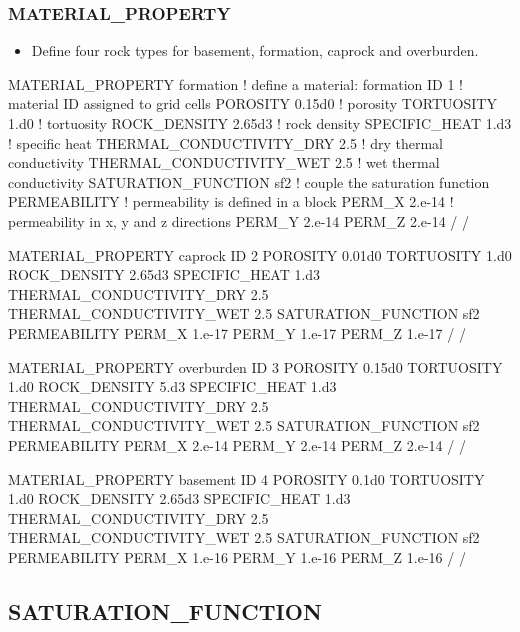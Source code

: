 \documentclass{beamer}
\newcommand\bluecomment[1]{{{\color{blue} #1}}}
\newcommand\greencomment[1]{{{\color{green} #1}}}
\begin{document}
\begin{frame}\frametitle{MATERIAL\_PROPERTY}

\begin{itemize}
  \item Define four rock types for basement, formation, caprock and overburden.
\end{itemize}

\begin{semiverbatim}
MATERIAL_PROPERTY formation \bluecomment{! define a material:} \greencomment{formation}
  ID 1  \bluecomment{! material ID assigned to grid cells}
  POROSITY 0.15d0 \bluecomment{! porosity}
  TORTUOSITY 1.d0 \bluecomment{! tortuosity}
  ROCK_DENSITY 2.65d3 \bluecomment{! rock density}
  SPECIFIC_HEAT 1.d3 \bluecomment{! specific heat}
  THERMAL_CONDUCTIVITY_DRY 2.5 \bluecomment{! dry thermal conductivity}
  THERMAL_CONDUCTIVITY_WET 2.5 \bluecomment{! wet thermal conductivity} 
  SATURATION_FUNCTION sf2 \bluecomment{! couple the saturation function}
  PERMEABILITY \bluecomment{! permeability is defined in a block}
    PERM_X 2.e-14 \bluecomment{! permeability in x, y and z directions}
    PERM_Y 2.e-14
    PERM_Z 2.e-14
  /
/

MATERIAL_PROPERTY caprock
  ID 2
  POROSITY 0.01d0
  TORTUOSITY 1.d0
  ROCK_DENSITY 2.65d3
  SPECIFIC_HEAT 1.d3
  THERMAL_CONDUCTIVITY_DRY 2.5
  THERMAL_CONDUCTIVITY_WET 2.5 
  SATURATION_FUNCTION sf2
  PERMEABILITY
    PERM_X 1.e-17
    PERM_Y 1.e-17
    PERM_Z 1.e-17
  /
/

MATERIAL_PROPERTY overburden
  ID 3
  POROSITY 0.15d0
  TORTUOSITY 1.d0
  ROCK_DENSITY 5.d3
  SPECIFIC_HEAT 1.d3
  THERMAL_CONDUCTIVITY_DRY 2.5
  THERMAL_CONDUCTIVITY_WET 2.5 
  SATURATION_FUNCTION sf2
  PERMEABILITY
    PERM_X 2.e-14
    PERM_Y 2.e-14
    PERM_Z 2.e-14
  /
/

MATERIAL_PROPERTY basement
  ID 4
  POROSITY 0.1d0
  TORTUOSITY 1.d0
  ROCK_DENSITY 2.65d3
  SPECIFIC_HEAT 1.d3
  THERMAL_CONDUCTIVITY_DRY 2.5
  THERMAL_CONDUCTIVITY_WET 2.5 
  SATURATION_FUNCTION sf2
  PERMEABILITY
    PERM_X 1.e-16
    PERM_Y 1.e-16
    PERM_Z 1.e-16
  /
/
\end{semiverbatim}

\end{frame}

\subsection{SATURATION\_FUNCTION}
\end{document}
